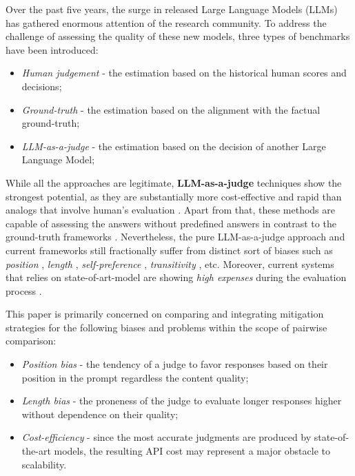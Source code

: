 \documentclass[sigconf, authoryear]{acmart}
\begin{document}
Over the past five years, the surge in released Large Language Models (LLMs) has gathered enormous attention of the research community.
To address the challenge of assessing the quality of these new models, three types of benchmarks have been introduced:
\begin{itemize}
    \item \textit{Human judgement} - the estimation based on the historical human scores and decisions\cite{chiang2024chatbotarenaopenplatform,liu2025amelostableframeworkarenabased};
    \item \textit{Ground-truth} - the estimation based on the alignment with the factual ground-truth\cite{hendrycks2021measuringmassivemultitasklanguage,srivastava2023beyond,zeng2024mrgsm8kmetareasoningbenchmarklarge,myrzakhan2024openllmleaderboardmultichoiceopenstylequestions};
    \item \textit{LLM-as-a-judge} - the estimation based on the decision of another Large Language Model\cite{mtbench,alpaca_eval,zhu2025judgelmfinetunedlargelanguage};
\end{itemize}

While all the approaches are legitimate, \textbf{LLM-as-a-judge} techniques show the strongest potential, as they are substantially more cost-effective and rapid than analogs that involve human's evaluation \cite{salinas2025tuningllmjudgedesign}.
Apart from that, these methods are capable of assessing the answers without predefined answers in contrast to the ground-truth frameworks \cite{zhu2025judgelmfinetunedlargelanguage}.
Nevertheless, the pure LLM-as-a-judge approach and current frameworks still fractionally suffer from distinct sort of biases such as \textit{position} \cite{shi2024judging, li-etal-2024-split, wei2025systematicevaluationllmasajudgellm}, \textit{length} \cite{hu2024explaining, lc_alpacha}, \textit{self-preference} \cite{self-preference}, \textit{transitivity} \cite{xu2025investigatingnontransitivityllmasajudge}, etc.
Moreover, current systems that relies on state-of-art-model are showing \textit{high expenses} during the evaluation process \cite{cascade_eval,ar_judge,salinas2025tuningllmjudgedesign,yue2024largelanguagemodelcascades}.

This paper is primarily concerned on comparing and integrating mitigation strategies for the following biases and problems within the scope of pairwise comparison:
\begin{itemize}
    \item \textit{Position bias} - the tendency of a judge to favor responses based on their position in the prompt regardless the content quality;
    \item \textit{Length bias} - the proneness of the judge to evaluate longer responses higher without dependence on their quality;
    \item \textit{Cost-efficiency} - since the most accurate judgments are produced by state-of-the-art models, the resulting API cost may represent a major obstacle to scalability.
\end{itemize}
\end{document}
